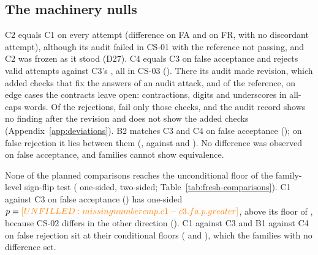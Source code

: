 \subsection{The machinery nulls}
\label{sec:results-nulls}
C2 equals C1 on every attempt (difference  on FA and  on FR, with no discordant attempt), although its audit failed in CS-01 with the reference not passing, and C2 was frozen as it stood (D27). C4 equals C3 on false acceptance and rejects  valid attempts against C3's , all in CS-03 (). There its audit made  revision, which added  checks that fix the answers of an audit attack, and of the reference, on edge cases the contracts leave open: contractions, digits and underscores in all-caps words. Of the rejections,  fail only those checks, and the audit record shows no finding after the revision and does not show the added checks (Appendix~\ref{app:deviations}). B2 matches C3 and C4 on false acceptance (); on false rejection it lies between them (, against  and ). No difference was observed on false acceptance, and  families cannot show equivalence.

None of the  planned comparisons reaches the unconditional floor of the family-level sign-flip test ( one-sided,  two-sided; Table~\ref{tab:fresh-comparisons}). C1 against C3 on false acceptance () has one-sided $p=\fv{cmp.c1-c3.fa.p.greater}$, above its floor of , because CS-02 differs in the other direction (). C1 against C3 and B1 against C4 on false rejection sit at their conditional floors ( and ), which the families with no difference set.


